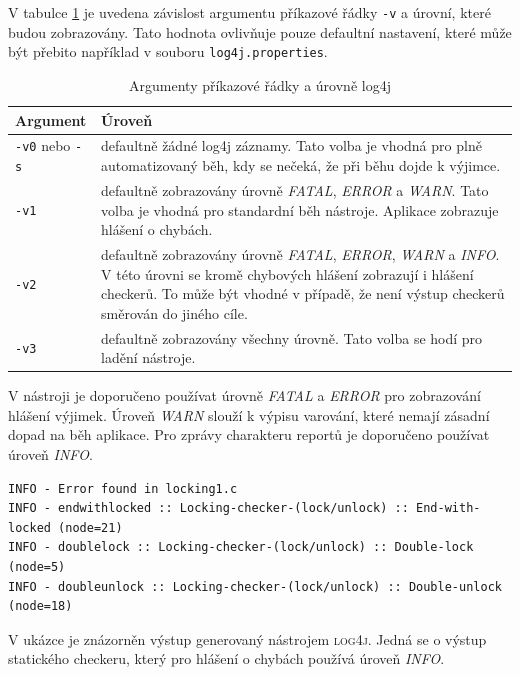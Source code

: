 \documentclass[11pt,final,oneside]{fithesis}
\begin{document}
V tabulce \ref{table-log4j} je uvedena závislost argumentu příkazové řádky \verb|-v| a úrovní, které budou zobrazovány. Tato hodnota ovlivňuje pouze defaultní nastavení, které může být přebito například v souboru \verb|log4j.properties|.


\begin{table}[h]
  \label{table-log4j}
  \begin{tabular}{ | l | p{9cm} | }
    \hline
    \textbf{Argument} & \textbf{Úroveň} \\ \hline \hline
    \verb|-v0| nebo \verb|-s| & defaultně žádné log4j záznamy. Tato volba je vhodná pro plně automatizovaný běh, kdy se nečeká, že při běhu dojde k výjimce. \\ \hline
    \verb|-v1| & defaultně zobrazovány úrovně \textit{FATAL}, \textit{ERROR} a \textit{WARN}. Tato volba je vhodná pro standardní běh nástroje. Aplikace zobrazuje hlášení o chybách. \\ \hline
    \verb|-v2| & defaultně zobrazovány úrovně \textit{FATAL}, \textit{ERROR}, \textit{WARN} a \textit{INFO}. V této úrovni se kromě chybových hlášení zobrazují i hlášení checkerů. To může být vhodné v případě, že není výstup checkerů směrován do jiného cíle. \\ \hline
    \verb|-v3| & defaultně zobrazovány všechny úrovně. Tato volba se hodí pro ladění nástroje. \\ \hline
    
  \end{tabular}
  \caption{Argumenty příkazové řádky a úrovně log4j}
\end{table}

V nástroji je doporučeno používat úrovně \textit{FATAL} a \textit{ERROR} pro zobrazování hlášení výjimek. Úroveň \textit{WARN} slouží k výpisu varování, které nemají zásadní dopad na běh aplikace. Pro zprávy charakteru reportů je doporučeno používat úroveň \textit{INFO}.

\begin{lstlisting}[caption=Ukázkový výstup nástroje \textsc{log4j}]
INFO - Error found in locking1.c
INFO - endwithlocked :: Locking-checker-(lock/unlock) :: End-with-locked (node=21)
INFO - doublelock :: Locking-checker-(lock/unlock) :: Double-lock (node=5)
INFO - doubleunlock :: Locking-checker-(lock/unlock) :: Double-unlock (node=18)
\end{lstlisting}

V ukázce je znázorněn výstup generovaný nástrojem \textsc{log4j}. Jedná se o výstup statického checkeru, který pro hlášení o chybách používá úroveň \textit{INFO}.
\end{document}
